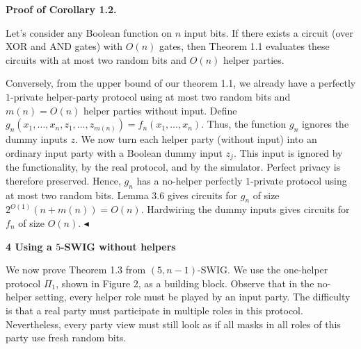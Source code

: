 \documentclass[10pt,a4paper]{article}
\begin{document}
\par\medskip\noindent\textbf{Proof of Corollary 1.2.}\par




Let’s consider any Boolean function on $n$ input bits. If there exists a circuit (over XOR and AND gates) with $O(n)$ gates, then Theorem 1.1 evaluates these circuits with at most two random bits and $O(n)$ helper parties.\par




Conversely, from the upper bound of our theorem 1.1, we already have a
perfectly $1$-private helper-party protocol using at most two random bits and $m(n)=O(n)$ helper parties without input. Define $g_{n}(x_{1},\dots,x_{n},z_{1},\dots,z_{m(n)})=f_{n}(x_{1},\dots,x_{n})$. Thus, the function $g_{n}$ ignores the dummy inputs $z$. We now turn each helper party (without input) into an ordinary input party with a Boolean dummy input $z_{j}$. This input is ignored by the functionality, by the real protocol, and by the simulator. Perfect privacy is therefore preserved. Hence, $g_{n}$ has a no-helper perfectly $1$-private protocol using at most two random bits. Lemma 3.6 gives circuits for $g_{n}$ of size $2^{O(1)}(n+m(n))=O(n)$. Hardwiring the dummy inputs gives circuits for $f_{n}$ of size $O(n)$.
$\blacktriangleleft$\par







\par\medskip\noindent\textbf{
4 Using a $5$-SWIG without helpers}\par




We now prove Theorem 1.3 from $(5,n-1)$-SWIG. We use the one-helper protocol $\Pi_{1}$, shown in Figure 2, as a building block. Observe that in the no-helper setting, every helper role must be played by an input party. The difficulty is that a real party must participate in multiple roles in this protocol. Nevertheless, every party view must still look as if all masks in all roles of this party use fresh random bits.\par
\end{document}
